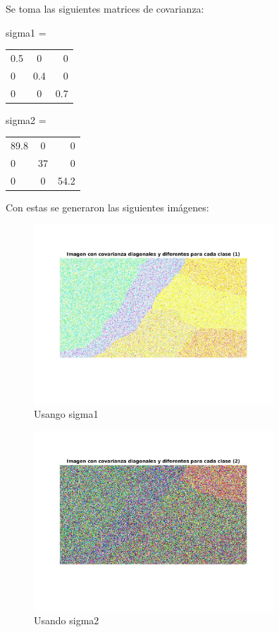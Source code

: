 \documentclass[a4paper,10pt]{article}
\begin{document}
Se toma las siguientes matrices de covarianza:

sigma1 = 
\begin{tabular}{ l c r }
  0.5 & 0 & 0 \\
  0 & 0.4 & 0 \\
  0 & 0 & 0.7 \\
\end{tabular}


sigma2 =
\begin{tabular}{ l c r }
  89.8 & 0 & 0 \\
  0 & 37 & 0 \\
  0 & 0 & 54.2 \\
\end{tabular}


Con estas se generaron las siguientes im\'agenes:

\begin{figure}[H]
\centering
\includegraphics[width=90mm]{imagenDD1.jpg}
\caption{Usango sigma1}
\end{figure}


\begin{figure}[H]
\centering
\includegraphics[width=90mm]{imagenDD2.jpg}
\caption{Usando sigma2}
\end{figure}
\end{document}
